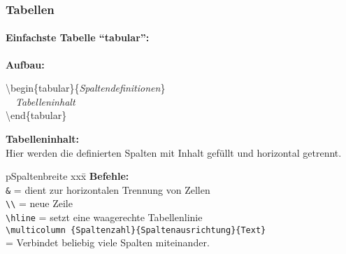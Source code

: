 
\begin{frame}
\frametitle{Tabellen}
\framesubtitle{Einfachste Tabelle "`tabular"':}
\medskip
\textbf{Aufbau:}\\
\begin{ttfamily}
\color{unibablueI}\textbackslash begin\color{black}\{tabular\}\{\textit{Spaltendefinitionen}\}\\
~~\textit{Tabelleninhalt}\\
\color{unibablueI}\textbackslash end\color{black}\{tabular\}\\
\end{ttfamily}
\medskip
\textbf{Tabelleninhalt:}\\
Hier werden die definierten Spalten mit Inhalt gefüllt und horizontal getrennt.
\begin{tabbing}[H]p{Spaltenbreite}
xxx\=\kill
\textbf{Befehle:}\\
\texttt{\color{nounibaredI}\&} \color{black} \>= dient zur horizontalen Trennung von Zellen\\
\texttt{\color{nounibaredI}\textbackslash \textbackslash} \color{black} \>=  neue Zeile\\
\texttt{\color{nounibaredI}\textbackslash hline} \color{black} \>= setzt eine waagerechte Tabellenlinie\\[2mm]
\texttt{\color{nounibaredI}\textbackslash multicolumn \color{black}\{Spaltenzahl\}\{Spaltenausrichtung\}\{Text\}}\\[2mm]
\>= Verbindet beliebig viele Spalten miteinander.\\
\end{tabbing}
\end{frame}




